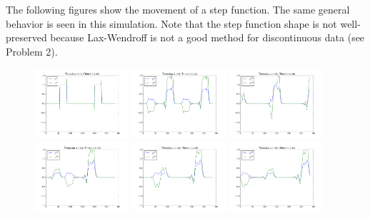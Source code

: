 \documentclass{article} %
\theoremstyle{plain}
\numberwithin{equation}{section} %
\numberwithin{figure}{section} %
\numberwithin{table}{section} %
\begin{document}
\begin{enumerate}[\ \ (a)]
        The following figures show the movement of a step function.  The same general behavior is seen in this simulation.  Note that the step function shape is not well-preserved because Lax-Wendroff is not a good method for discontinuous data (see Problem 2).
        \begin{figure}[ht!]
            \centering
            \includegraphics[width=0.31\textwidth]{figures/problem_1_b_000.png}
            \includegraphics[width=0.31\textwidth]{figures/problem_1_b_008.png}
            \includegraphics[width=0.31\textwidth]{figures/problem_1_b_016.png}
            \includegraphics[width=0.31\textwidth]{figures/problem_1_b_024.png}
            \includegraphics[width=0.31\textwidth]{figures/problem_1_b_032.png}
            \includegraphics[width=0.31\textwidth]{figures/problem_1_b_040.png}

\end{figure}
\end{enumerate}
\end{document}
